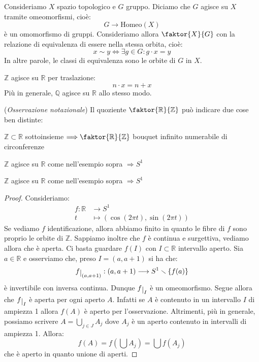 Consideriamo $X$ spazio topologico e $G$ gruppo. Diciamo che $G$ agisce su $X$ tramite omeomorfismi, cioè:
$$G \longrightarrow \text{Homeo}(X)$$
è un omomorfismo di gruppi. Consideriamo allora $\faktor{X}{G}$ con la relazione di equivalenza di essere nella stessa orbita, cioè:
$$x \sim y \Longleftrightarrow \exists g \in G: g \cdot x=y$$
In altre parole, le classi di equivalenza sono le orbite di $G$ in $X$.
\begin{ex}
$\mathbb{Z}$ agisce su $\mathbb{R}$ per traslazione:
$$n \cdot x=n+x$$
Più in generale, $\mathbb{Q}$ agisce su $\mathbb{R}$ allo stesso modo.
\end{ex}

\begin{oss}(\emph{Osservazione notazionale})
Il quoziente $\faktor{\mathbb{R}}{\mathbb{Z}}$ può indicare due cose ben distinte:
\begin{nlist}
\item $\mathbb{Z} \subset \mathbb{R}$ sottoinsieme $\Longrightarrow \faktor{\mathbb{R}}{\mathbb{Z}}$ bouquet infinito numerabile di circonferenze
\item $\mathbb{Z}$ agisce su $\mathbb{R}$ come nell'esempio sopra $\Longrightarrow S^1$
\end{nlist}
\end{oss}

\begin{prop}
$\mathbb{Z}$ agisce su $\mathbb{R}$ come nell'esempio sopra $\Longrightarrow S^1$
\end{prop}
\begin{proof}
Consideriamo:
\begin{align*}
f:\mathbb{R} &\longrightarrow S^1 \\
t &\longmapsto (\cos(2\pi t), \sin (2\pi t))
\end{align*}
Se vediamo $f$ identificazione, allora abbiamo finito in quanto le fibre di $f$ sono proprio le orbite di $\mathbb{Z}$. Sappiamo inoltre che $f$ è continua e surgettiva, vediamo allora che è aperta. Ci basta guardare $f(I)$ con $I \subset \mathbb{R}$ intervallo aperto. Sia $a \in \mathbb{R}$ e osserviamo che, preso $I=(a,a+1)$ si ha che:
$$f \restrict {(a,a+1)}:(a,a+1) \longrightarrow S^1 \smallsetminus \{f(a)\}$$
è invertibile con inversa continua. Dunque $f \restrict {I}$ è un omeomorfismo. Segue allora che $f \restrict {I}$ è aperta per ogni aperto $A$. Infatti se $A$ è contenuto in un intervallo $I$ di ampiezza 1 allora $f(A)$ è aperto per l'osservazione. Altrimenti, più in generale, possiamo scrivere $A= \bigcup _{j \in J} A_j$ dove $A_j$ è un aperto contenuto in intervalli di ampiezza 1. Allora:
$$f(A)=f\left(\bigcup A_j\right)=\bigcup f(A_j)$$
che è aperto in quanto unione di aperti.
\end{proof}

